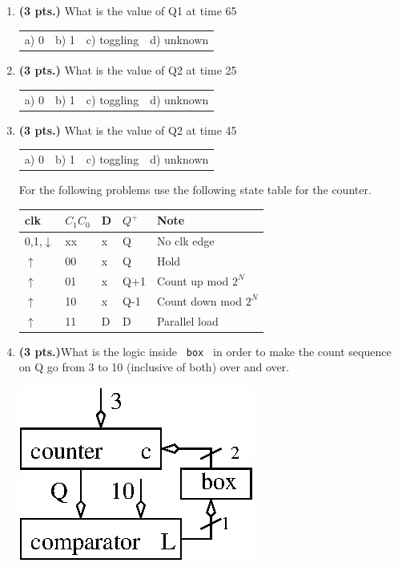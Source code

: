 \documentclass{article}
\begin{document}
\begin{enumerate}
\item {\bf (3 pts.)} What is the value of Q1 at time 65

\begin{tabular}{p{0.75in}p{0.75in}p{0.75in}p{1.25in}}
a) 0 & b) 1 & c) toggling & d) unknown \\
\end{tabular}

\item {\bf (3 pts.)} What is the value of Q2 at time 25

\begin{tabular}{p{0.75in}p{0.75in}p{0.75in}p{1.25in}}
a) 0 & b) 1 & c) toggling & d) unknown \\
\end{tabular}

\item {\bf (3 pts.)} What is the value of Q2 at time 45

\begin{tabular}{p{0.75in}p{0.75in}p{0.75in}p{1.25in}}
a) 0 & b) 1 & c) toggling & d) unknown \\
\end{tabular}


\pagebreak
For the following problems use the following state table
for the counter.

\begin{tabular}{l|l|l||l|l}
clk             & $C_1 C_0$     & D & $Q^+$  & Note  \\ \hline
0,1,$\downarrow$& xx            & x & Q      & No clk edge  \\ \hline
$\uparrow$      & 00            & x & Q      & Hold  \\  \hline
$\uparrow$      & 01            & x & Q+1    & Count up mod $2^N$	\\  \hline
$\uparrow$      & 10            & x & Q-1    & Count down mod $2^N$	\\  \hline
$\uparrow$      & 11            & D & D      & Parallel load \\
\end{tabular}

\item {\bf (3 pts.)}What is the logic inside \verb+ box + in order
to make the count sequence on Q go from 3 to 10 (inclusive of both)
over and over.

\includegraphics{./Fig2/OddCnt}


\end{enumerate}
\end{document}
